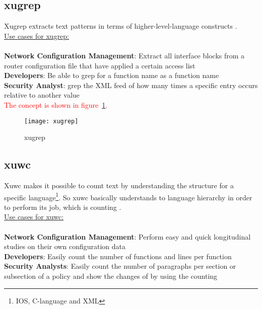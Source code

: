 \subsection{xugrep}

Xugrep extracts text patterns in terms of higher-level-language constructs \cite{xutools01}.\\

\underline{Use cases for xugrep:} \\ \\

\textbf{Network Configuration Management}: Extract all interface blocks from a router configuration file that have applied a certain access list\\
\textbf{Developers}: Be able to grep for a function name as a function name\\
\textbf{Security Analyst}: grep the XML feed of how many times a specific entry occurs relative to another value\\

\textcolor{red}{The concept is shown in figure~\ref{fig:xugrep}.}\\

\begin{center}
        \begin{figure}[h!]
          \centering
                \texttt{[image: xugrep]}
          \caption{xugrep}
          \label{fig:xugrep}
        \end{figure}
\end{center}
\newpage

\subsection{xuwc}

Xuwc makes it possible to count text by understanding the structure for a specific language\footnote{IOS, C-language and XML}. So xuwc basically understands to language hierarchy in order to perform its job, which is counting \cite{xutools01}. \\

\underline{Use cases for xuwc:} \\ \\

\textbf{Network Configuration Management}: Perform easy and quick longitudinal studies on their own configuration data\\
\textbf{Developers}: Easily count the number of functions and lines per function\\
\textbf{Security Analysts}: Easily count the number of paragraphs per section or subsection of a policy and show the changes of by using the counting\\

